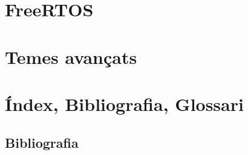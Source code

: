 \part{FreeRTOS}
\label{part:freertos}


\part{Temes avançats}
\label{part:avançats}


% 

\part{Índex, Bibliografia, Glossari}




\chapter*{Bibliografia}


\printbibliography[heading=bibempty, type=misc]

